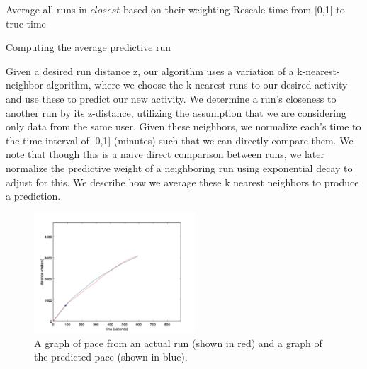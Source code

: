 \documentclass[twoside]{article}
\begin{document}
\begin{multicols}{2}
\begin{algorithm}[H]
 Average all runs in $closest$ based on their weighting\linebreak\linebreak
 Rescale time from [0,1] to true time
 
 \caption{Computing the average predictive run}
\end{algorithm}
	
	Given a desired run distance z, our algorithm uses a variation of a k-nearest-neighbor algorithm, where we choose the k-nearest runs to our desired activity and use these to predict our new activity.  We determine a run's closeness to another run by its z-distance, utilizing the assumption that we are considering only data from the same user.  Given these neighbors, we normalize each's time to the time interval of [0,1] (minutes) such that we can directly compare them. We note that though this is a naive direct comparison between runs, we later normalize the predictive weight of a neighboring run using exponential decay to adjust for this.  We describe how we average these k nearest neighbors to produce a prediction.\\
	
\begin{figure}[H]
\begin{center}
\includegraphics[width=6cm]{overlap_run.png}
\caption{A graph of pace from an actual run (shown in red) and a graph of the predicted pace (shown in blue). }
\end{center}
\end{figure}
	

\end{multicols}
\end{document}
